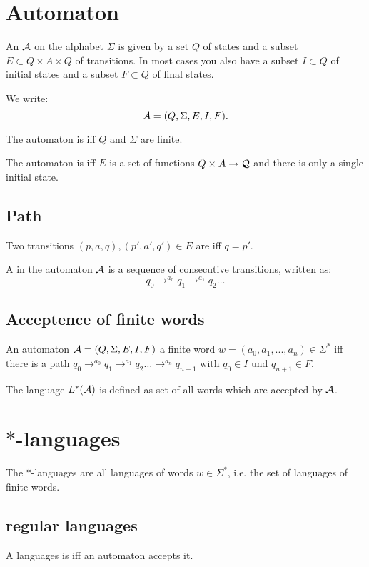 

\section{Automaton}

An  $\mathcal{A}$ on the alphabet $\Sigma$ is given by a set $Q$ of states and a subset $E \subset Q \times A \times Q$ of transitions. In most cases you also have a subset $I \subset Q$ of initial states and a subset $F \subset Q$ of final states.

We write:
\[ \mathcal{A} = (Q, \Sigma, E, I, F). \]

The automaton is  iff $Q$ and $\Sigma$ are finite.

The automaton is  iff $E$ is a set of functions $Q \times A \rightarrow \mathcal{Q}$ and there is only a single initial state.

\subsection{Path}
Two transitions $(p,a,q), (p',a',q') \in E$ are  iff $q=p'$.

A  in the automaton $\mathcal{A}$ is a sequence of consecutive transitions, written as:
\[ q_0 \rightarrow^{a_0} q_1 \rightarrow^{a_1} q_2 \dots \]

\subsection{Acceptence of finite words}

An automaton $\mathcal{A} = (Q, \Sigma, E, I, F)$  a finite word $w = (a_0,a_1,...,a_n) \in \Sigma^*$ iff there is a path $q_0 \rightarrow^{a_0} q_1 \rightarrow^{a_1} q_2 \dots \rightarrow^{a_n} q_{n+1}$ with $q_0 \in I$ und $q_{n+1} \in F$.

The language $L^*(\mathcal{A})$ is defined as set of all words which are accepted by $\mathcal{A}$.

\section{$*$-languages}
The $*$-languages are all languages of words $w \in \Sigma^*$, i.e. the set of languages of finite words.

\subsection{regular languages}
A languages is  iff an automaton accepts it.

